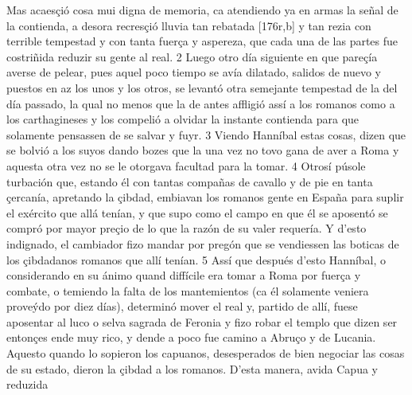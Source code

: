 \documentclass[11pt,twoside]{article}\makeatletter
\def\persName{}\def\name{}
\def\placeName{}
\begin{document}
\pend
{} Mas acaesçió cosa mui digna de memoria, ca atendiendo ya en armas la señal de la contienda, a desora recresçió lluvia tan rebatada %
[176r,b] y tan rezia con terrible tempestad y con tanta fuerça y aspereza, que cada una de las partes fue costriñida reduzir su gente al real. 2 Luego otro día siguiente en que pareçía averse de pelear, pues aquel poco tiempo se avía dilatado, salidos de nuevo y puestos en az los unos y los otros, se levantó otra semejante tempestad de la del día passado, la qual no menos que la de antes affligió assí a los romanos como a los  {\name carthagineses} y los compelió a olvidar la instante contienda para que solamente pensassen de se salvar y fuyr. 3 Viendo  {\persName Hanníbal} estas cosas, dizen que se bolvió a los suyos dando bozes que la una vez no tovo gana de aver a  {\placeName Roma} y aquesta otra vez no se le otorgava facultad para la tomar. 4 Otrosí púsole turbación que, estando él con tantas compañas de cavallo y de pie en tanta çercanía, apretando la çibdad, embiavan los romanos gente en  {\placeName España} para suplir el exército que allá tenían, y que supo como el campo en que él se aposentó se compró por mayor preçio de lo que la razón de su valer requería. Y d’esto indignado, el cambiador fizo mandar por pregón que se vendiessen las boticas de los çibdadanos romanos que allí tenían. 5 Assí que después d’esto  {\persName Hanníbal}, o considerando en su ánimo quand diffícile era tomar a  {\placeName Roma} por fuerça y combate, o temiendo la falta de los mantemientos (ca él solamente veniera proveýdo por diez días), determinó mover el real y, partido de allí, fuese aposentar al luco o selva sagrada de Feronia y fizo robar el templo que dizen ser entonçes ende muy rico, y dende a poco fue camino a Abruço y de Lucania.
\pend
{} Aquesto quando lo sopieron los capuanos, desesperados de bien negociar las cosas de su estado, dieron la çibdad a los romanos. D’esta manera, avida Capua y reduzida %
\end{document}
